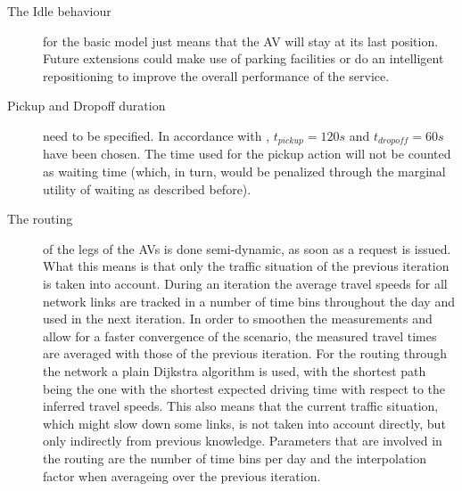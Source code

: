 \begin{description}
\item[The Idle behaviour] for the basic model just means that the AV will stay at
its last position. Future extensions could make use of parking facilities or do
an intelligent repositioning to improve the overall performance of the service.

\item[Pickup and Dropoff duration] need to be specified. In accordance with
, $t_{pickup} = 120s$ and $t_{dropoff} = 60s$ have been chosen. The time
used for the pickup action will not be counted as waiting time (which, in turn,
would be penalized through the marginal utility of waiting as described before).

\item[The routing] of the legs of the AVs is done semi-dynamic, as soon as a
request is issued. What this means is that only the traffic situation of the
previous iteration is taken into account. During an iteration the average travel
speeds for all network links are tracked in a number of time bins throughout the
day and used in the next iteration. In order to smoothen the measurements and
allow for a faster convergence of the scenario, the measured travel times are
averaged with those of the previous iteration.
For the routing through the network a plain
Dijkstra algorithm is used, with the shortest path being the one with the shortest
expected driving time with respect to the inferred travel speeds. This
also means that the current traffic situation, which might slow down some links,
is not taken into account directly, but only indirectly from previous knowledge.
Parameters that are involved in the routing are the number of time bins per day
and the interpolation factor when averageing over the previous iteration.
\end{description}

